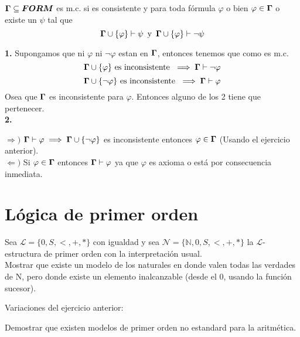 \documentclass[leqno, 12pt, twoside,letterpaper]{book}
\begin{document}
\begin{solucion}
\begin{defi}
$\bm{\Gamma} \subseteq \bm{FORM}$ es m.c. si es consistente y para toda fórmula $\varphi$ o bien $\varphi \in \bm{\Gamma}$ o existe un $\psi$ tal que
\[\bm{\Gamma} \cup \{ \varphi \} \vdash \psi \mbox{\, y\, }  \bm{\Gamma} \cup \{ \varphi \} \vdash \lnot\psi\]
\end{defi}


\noindent\textbf{1.} Supongamos que ni $\varphi$ ni $\lnot\varphi$ estan en $\bm{\Gamma}$, entonces tenemos que como es m.c.
	\[ \bm{\Gamma} \cup \{ \varphi \} \mbox{ es inconsistente } \implies \bm{\Gamma} \vdash \lnot\varphi \]
	\[ \bm{\Gamma} \cup \{ \lnot\varphi \} \mbox{ es inconsistente } \implies \bm{\Gamma} \vdash \varphi \]
Osea que $\bm{\Gamma}$ es inconsistente para $\varphi$. Entonces alguno de los 2 tiene que pertenecer. \\

\noindent\textbf{2.}
\begin{dem}
$\Rightarrow)$ $\bm{\Gamma} \vdash \varphi \implies \bm{\Gamma} \cup \{ \lnot\varphi \}$ es inconsistente entonces $\varphi \in \bm{\Gamma}$ (Usando el ejercicio anterior). \\
\noindent $\Leftarrow)$ Si $\varphi \in \bm{\Gamma} $ entonces $\bm{\Gamma} \vdash \varphi$ ya que $\varphi$ es axioma o está por consecuencia inmediata.
\end{dem}

\end{solucion}




\chapter{Lógica de primer orden}

\begin{ej}{8}
    Sea $\bm{\mathcal{L}} = \{0, S, <, +, *\}$ con igualdad y sea
    $\bm{\mathcal{N}} = \{\mathbb{N},
    0, S, <, +, *\}$ la $\bm{\mathcal{L}}$-estructura de primer orden con la
    interpretación usual. \\ Mostrar que existe un modelo de los naturales en donde
    valen todas las verdades de N, pero donde existe un elemento inalcanzable
    (desde el 0, usando la función sucesor).
\end{ej}

\noindent Variaciones del ejercicio anterior:

\begin{ej}{1}
    Demostrar que existen modelos de primer orden no estandard para la
    aritmética.
\end{ej}
\end{document}
